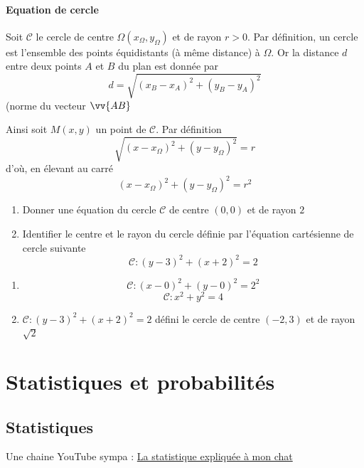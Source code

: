 \subsection{Equation de cercle}
Soit $\mathscr{C}$ le cercle de centre $\Omega (x_\Omega,y_\Omega)$ et de rayon $r > 0$. Par définition, un cercle est l'ensemble des points équidistants (à même distance) à $\Omega$. Or la distance $d$ entre deux points $A$ et $B$ du plan est donnée par $$d = \sqrt{(x_B - x_A)^2 + (y_B - y_A)^2}$$ (norme du vecteur $\vv{AB}$\newline

Ainsi soit $M (x,y)$ un point de $\mathscr{C}$. Par définition 
$$\sqrt{(x - x_\Omega)^2 + (y - y_\Omega)^2} = r$$
d'où, en élevant au carré
$$(x - x_\Omega)^2 + (y - y_\Omega)^2 = r^2$$

\newline

\begin{exemples}
\begin{enumerate}
\item Donner une équation du cercle $\mathscr{C}$ de centre $(0,0)$ et de rayon $2$
\item Identifier le centre et le rayon du cercle définie par l'équation cartésienne de cercle suivante $$\mathscr{C} : (y-3)^2 + (x+2)^2 = 2$$
\end{enumerate}
\begin{enumerate}
\item $$\mathscr{C} : (x - 0)^2 + (y-0)^2 = 2^2$$
$$\mathscr{C} : x^2 + y^2 = 4$$
\item $\mathscr{C} : (y-3)^2 + (x+2)^2 = 2$ défini le cercle de centre $(-2,3)$ et de rayon $\sqrt{2}$
\end{enumerate}
\end{exemples}
\part{Statistiques et probabilités}
\chapter{Statistiques}
\label{chap:stats}
Une chaine YouTube sympa : \underline{La statistique expliquée à mon chat} \newline

